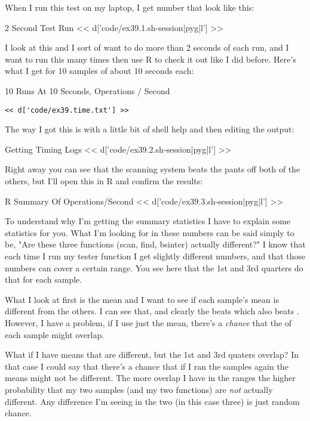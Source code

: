 When I run this test on my laptop, I get number that look like this:

\begin{code}{2 Second Test Run}
<< d['code/ex39.1.sh-session|pyg|l'] >>
\end{code}

I look at this and I sort of want to do more than 2 seconds of each run, and I
want to run this many times then use R to check it out like I did before.
Here's what I get for 10 samples of about 10 seconds each:

\begin{code}{10 Runs At 10 Seconds, Operations / Second}
\begin{Verbatim}
<< d['code/ex39.time.txt'] >>
\end{Verbatim}
\end{code}

The way I got this is with a little bit of shell help and then editing the
output:

\begin{code}{Getting Timing Logs}
<< d['code/ex39.2.sh-session|pyg|l'] >>
\end{code}

Right away you can see that the scanning system beats the pants off both of the
others, but I'll open this in R and confirm the results:

\begin{code}{R Summary Of Operations/Second}
<< d['code/ex39.3.sh-session|pyg|l'] >>
\end{code}

To understand why I'm getting the summary statistics I have to explain some
statistics for you.  What I'm looking for in these numbers can be said simply
to be, "Are these three functions (scan, find, bsinter) actually different?"  I
know that each time I run my tester function I get slightly different numbers,
and that those numbers can cover a certain range.  You see here that the
1st and 3rd quarters do that for each sample.

What I look at first is the mean and I want to see if each sample's mean is
different from the others.  I can see that, and clearly the  beats
 which also beats .  However, I have a problem, if I
use just the mean, there's a \emph{chance} that the  of each
sample might overlap.

What if I have means that are different, but the 1st and 3rd quaters overlap?
In that case I could say that there's a chance that if I ran the samples again
the means might not be different.  The more overlap I have in the ranges the
higher probability that my two samples (and my two functions) are \emph{not}
actually different.  Any difference I'm seeing in the two (in this case three)
is just random chance.

